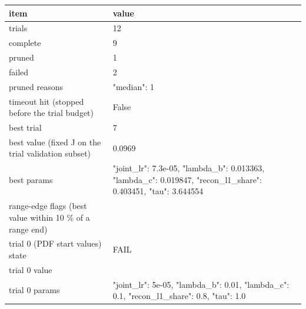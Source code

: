 \begin{tabular}{ll}
\hline
item & value \\
\hline
trials & 12 \\
complete & 9 \\
pruned & 1 \\
failed & 2 \\
pruned reasons & {"median": 1} \\
timeout hit (stopped before the trial budget) & False \\
best trial & 7 \\
best value (fixed J on the trial validation subset) & 0.0969 \\
best params & {"joint\_lr": 7.3e-05, "lambda\_b": 0.013363, "lambda\_c": 0.019847, "recon\_l1\_share": 0.403451, "tau": 3.644554} \\
range-edge flags (best value within 10 \% of a range end) & {} \\
trial 0 (PDF start values) state & FAIL \\
trial 0 value &  \\
trial 0 params & {"joint\_lr": 5e-05, "lambda\_b": 0.01, "lambda\_c": 0.1, "recon\_l1\_share": 0.8, "tau": 1.0} \\
\hline
\end{tabular}
